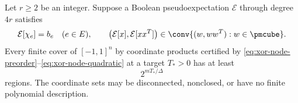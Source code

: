 \begin{theorem}\label{thm:xor-transfer}
Let $r\ge2$ be an integer. Suppose a Boolean pseudoexpectation $\mathcal E$
through degree $4r$ satisfies
\begin{equation}\label{eq:xor-source-assumptions}
 \mathcal E[\chi_e]=b_e\quad(e\in E),\qquad
 \bigl(\mathcal E[x],\mathcal E[xx^T]\bigr)
 \in\conv\{(w,ww^T):w\in\pmcube\}.
\end{equation}
Every finite cover of $[-1,1]^n$ by coordinate products certified by
\eqref{eq:xor-node-preorder}--\eqref{eq:xor-node-quadratic} at a target
$T_*>0$ has at least
\begin{equation}\label{eq:xor-transfer-count}
 2^{mT_*/\Delta}
\end{equation}
regions. The coordinate sets may be disconnected, nonclosed, or have no
finite polynomial description.
\end{theorem}
